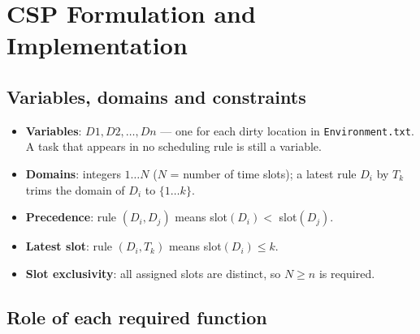 \documentclass[11pt,a4paper]{article}
\newcommand{\code}[1]{\texttt{#1}}
\begin{document}
\section{CSP Formulation and Implementation}

\subsection{Variables, domains and constraints}

\begin{itemize}[leftmargin=1.2cm]
  \item \textbf{Variables}: $D1,D2,\ldots,Dn$ --- one for each dirty location in
        \code{Environment.txt}. A task that appears in no scheduling rule is still a variable.
  \item \textbf{Domains}: integers $1\ldots N$ ($N$ = number of time slots); a latest rule
        $D_i$ by $T_k$ trims the domain of $D_i$ to $\{1\ldots k\}$.
  \item \textbf{Precedence}: rule $(D_i,D_j)$ means slot$(D_i) <$ slot$(D_j)$.
  \item \textbf{Latest slot}: rule $(D_i,T_k)$ means slot$(D_i)\le k$.
  \item \textbf{Slot exclusivity}: all assigned slots are distinct, so $N\ge n$ is required.
\end{itemize}

\subsection{Role of each required function}
\end{document}

